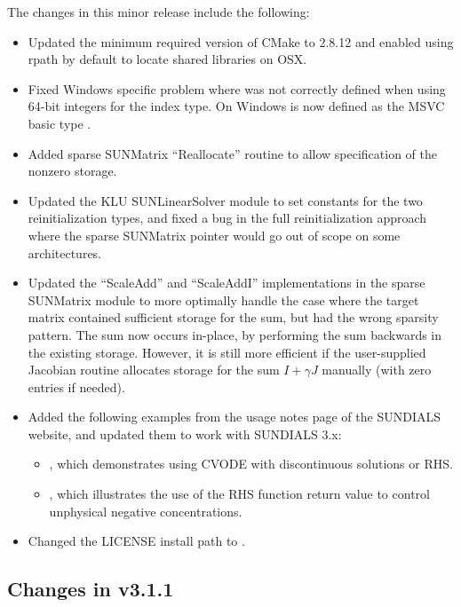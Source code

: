The changes in this minor release include the following:
\begin{itemize}
\item Updated the minimum required version of CMake to 2.8.12 and enabled
  using rpath by default to locate shared libraries on OSX.
\item Fixed Windows specific problem where  was not correctly
  defined when using 64-bit integers for the {\sundials} index type. On Windows
   is now defined as the MSVC basic type .
\item Added sparse SUNMatrix ``Reallocate'' routine to allow specification of
  the nonzero storage.
\item Updated the KLU SUNLinearSolver module to set constants for the two
  reinitialization types, and fixed a bug in the full reinitialization
  approach where the sparse SUNMatrix pointer would go out of scope on
  some architectures.
\item Updated the ``ScaleAdd'' and ``ScaleAddI'' implementations in the
  sparse SUNMatrix module to more optimally handle the case where the
  target matrix contained sufficient storage for the sum, but had the
  wrong sparsity pattern.  The sum now occurs in-place, by performing
  the sum backwards in the existing storage.  However, it is still more
  efficient if the user-supplied Jacobian routine allocates storage for
  the sum $I+\gamma J$ manually (with zero entries if needed).
\item Added the following examples from the usage notes page of the SUNDIALS website,
  and updated them to work with SUNDIALS 3.x:
  \begin{itemize}
  \item {}, which demonstrates using CVODE with
    discontinuous solutions or RHS.
  \item {}, which illustrates the
    use of the RHS function return value to control unphysical negative
    concentrations.
  \end{itemize}
\item Changed the LICENSE install path to .
\end{itemize}

\subsection*{Changes in v3.1.1}

